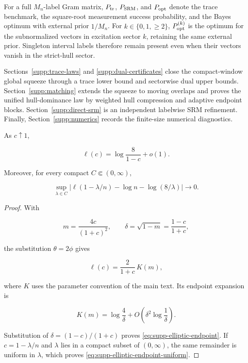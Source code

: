 For a full \(M_n\)-label Gram matrix, \(P_{\rm tr}\), \(P_{\rm SRM}\), and
\(P_{\rm opt}\) denote the trace benchmark, the square-root measurement
success probability, and the Bayes optimum with external prior \(1/M_n\).
For \(k\in\{0,1,\ge2\}\), \(P_{\rm opt}^{(k)}\) is the optimum for the
subnormalized vectors in excitation sector \(k\), retaining the same external
prior. Singleton interval labels therefore remain present even when their
vectors vanish in the strict-hull sector.

Sections~\ref{supp:trace-laws} and \ref{supp:dual-certificates} close the
compact-window global squeeze through a trace lower bound and sectorwise dual
upper bounds. Section~\ref{supp:matching} extends the squeeze to moving
overlaps and proves the unified hull-dominance law by weighted hull
compression and adaptive endpoint blocks. Section~\ref{supp:direct-srm} is an
independent labelwise SRM refinement. Finally, Section~\ref{supp:numerics}
records the finite-size
numerical diagnostics.

\begin{lemma}
\label{lem:supp-elliptic-endpoint}
As \(c\uparrow1\),

\begin{equation}\label{eq:supp-elliptic-endpoint}
 \ell(c)=\log\frac{8}{1-c}+o(1).
\end{equation}

Moreover, for every compact \(C\Subset(0,\infty)\),

\begin{equation}\label{eq:supp-elliptic-endpoint-uniform}
 \sup_{\lambda\in C}
 \left|\ell(1-\lambda/n)-\log n-\log(8/\lambda)\right|
 \longrightarrow0.
\end{equation}
\end{lemma}

\begin{proof}
With

\[
 m=\frac{4c}{(1+c)^2},
 \qquad \delta=\sqrt{1-m}=\frac{1-c}{1+c},
\]

the substitution \(\theta=2\phi\) gives

\[
 \ell(c)=\frac{2}{1+c}\,K(m),
\]

where \(K\) uses the parameter convention of the main text. Its endpoint
expansion is

\[
 K(m)=\log\frac4\delta
 +O\!\left(\delta^2\log\frac1\delta\right).
\]

Substitution of \(\delta=(1-c)/(1+c)\) proves
\eqref{eq:supp-elliptic-endpoint}. If \(c=1-\lambda/n\) and \(\lambda\) lies
in a compact subset of \((0,\infty)\), the same remainder is uniform in
\(\lambda\), which proves \eqref{eq:supp-elliptic-endpoint-uniform}.
\end{proof}

